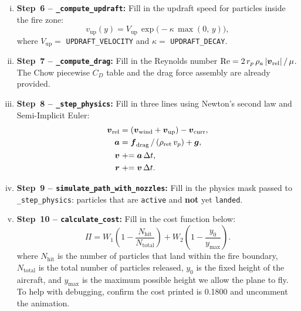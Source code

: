 \documentclass{article}
\begin{document}
\begin{enumerate}
\begin{enumerate}[(i)]
    \item \textbf{Step~6 -- \texttt{\_compute\_updraft}:}
          Fill in the updraft speed for particles inside the fire zone:
          \begin{equation*}
              v_\text{up}(y) = V_\text{up}\,\exp\!\bigl(-\kappa\,\max(0,\,y)\bigr),
          \end{equation*}
          where $V_\text{up} = $ \texttt{UPDRAFT\_VELOCITY} and $\kappa = $ \texttt{UPDRAFT\_DECAY}.

    \item \textbf{Step~7 -- \texttt{\_compute\_drag}:}
          Fill in the Reynolds number
          $\mathrm{Re} = 2\,r_p\,\rho_a\,|\mbox{\boldmath $v$}_\text{rel}|\,/\,\mu$.
          The Chow piecewise $C_D$ table and the drag force assembly are already provided.

    \item \textbf{Step~8 -- \texttt{\_step\_physics}:}
          Fill in three lines using Newton's second law and Semi-Implicit Euler:
          \begin{align*}
              \mbox{\boldmath $v$}_\text{rel} &= (\mbox{\boldmath $v$}_\text{wind} + \mbox{\boldmath $v$}_\text{up}) - \mbox{\boldmath $v$}_\text{curr}, \\
              \mbox{\boldmath $a$}             &= \mbox{\boldmath $f$}_\text{drag}\,/\,(\rho_\text{ret}\,v_p) + \mbox{\boldmath $g$}, \\
              \mbox{\boldmath $v$}             &\mathrel{+}= \mbox{\boldmath $a$}\,\Delta t, \\ 
              \mbox{\boldmath $r$}              &\mathrel{+}= \mbox{\boldmath $v$}\,\Delta t.
          \end{align*}

    \item \textbf{Step~9 -- \texttt{simulate\_path\_with\_nozzles}:}
          Fill in the physics mask passed to \texttt{\_step\_physics}:
          particles that are \texttt{active} and \textbf{not} yet \texttt{landed}.

    \item \textbf{Step~10 -- \texttt{calculate\_cost}:}
          Fill in the cost function below:
          \begin{equation*} \label{eq:cost}
              \Pi = W_1\!\left(1 - \frac{N_\text{hit}}{N_\text{total}}\right)
                  + W_2\!\left(1 - \frac{y_0}{y_{\max}}\right).
          \end{equation*}
          where $N_\text{hit}$ is the number of particles that land within the fire boundary,  $N_\text{total}$ is the total number of particles released, $y_0$ is the fixed height of the aircraft, and $y_{\text{max}}$ is the maximum possible height we allow the plane to fly.
To help with debugging, confirm the cost printed is 0.1800 and uncomment the animation.
\end{enumerate}




\end{enumerate}
\end{document}
